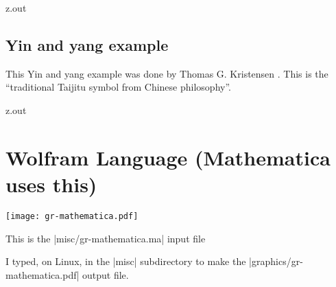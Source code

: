 \MyIO

\begin{VerbatimOut}{z.out}


\subsection{Yin and yang example}

This Yin and yang example was done by Thomas G. Kristensen \cite{kristensen}.
This is the ``traditional Taijitu symbol from Chinese philosophy''.

\end{VerbatimOut}

\MyIO


\begin{VerbatimOut}{z.out}

\section{Wolfram Language (Mathematica uses this)}


\texttt{[image: gr-mathematica.pdf]}

This is the |misc/gr-mathematica.ma| input file

I typed, on Linux,
in the |misc| subdirectory
to make the |graphics/gr-mathematica.pdf| output file.
\end{VerbatimOut}

\MyIO
